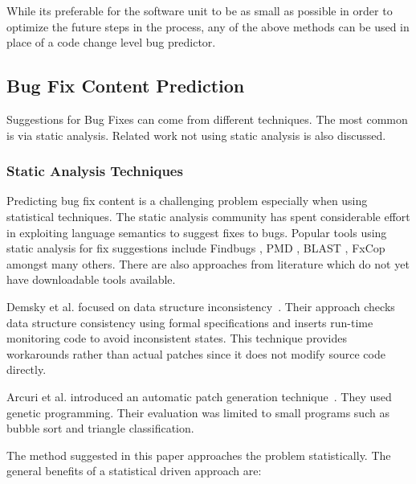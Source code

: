 \documentclass[preprint,10pt]{sigplanconf}
\begin{document}
\par While its preferable for the software unit to be as small as possible in order to optimize the future steps in the process, any of the above methods can be used in place of a code change level bug predictor.

\subsection{Bug Fix Content Prediction}

Suggestions for Bug Fixes can come from different techniques. The most common is via static analysis. Related work not using static analysis is also discussed. 

\subsubsection{Static Analysis Techniques}

Predicting bug fix content is a challenging problem especially when
using statistical techniques. The static analysis community has spent
considerable effort in exploiting language semantics to suggest fixes
to bugs. Popular tools using static analysis for fix suggestions
include Findbugs \cite{ayewah2008using}, PMD \cite{rutar2004comparison}, BLAST \cite{muhlberg2007blast}, FxCop \cite{wagner2008evaluation} amongst many others. There are also approaches from literature which do not yet have downloadable tools available. 

Demsky et al. focused on data structure
inconsistency~\cite{demsky_data_2005,demsky_inference_2006}. Their approach
checks data structure consistency using formal specifications and inserts
run-time monitoring code to avoid inconsistent states. This technique
provides workarounds rather than actual patches since it does not modify source
code directly.

Arcuri et al. introduced an automatic patch generation
technique~\cite{arcuri_automation_2008,arcuri_multi-objective_2008,arcuri_novel_2008}. They used genetic programming. Their evaluation was limited to
small programs such as bubble sort and triangle classification.

The method suggested in this paper
approaches the problem statistically. The general benefits of a statistical
driven approach are:
\end{document}
